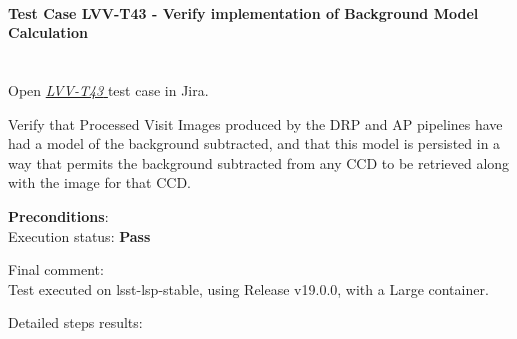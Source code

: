 \documentclass[DM,STR,toc]{lsstdoc}
\begin{document}
\paragraph{Test Case LVV-T43 -  Verify implementation of Background Model Calculation
 }\mbox{}\\

Open  \href{https://jira.lsstcorp.org/secure/Tests.jspa#/testCase/LVV-T43}{\textit{ LVV-T43 } }
test case in Jira.

 Verify that Processed Visit Images produced by the DRP and AP pipelines
have had a model of the background subtracted, and that this model is
persisted in a way that permits the background subtracted from any CCD
to be retrieved along with the image for that CCD.


\textbf{ Preconditions}:\\


Execution status: {\bf Pass }

Final comment:\\ Test executed on lsst-lsp-stable, using Release v19.0.0, with a Large
container.



Detailed steps results:
\end{document}
